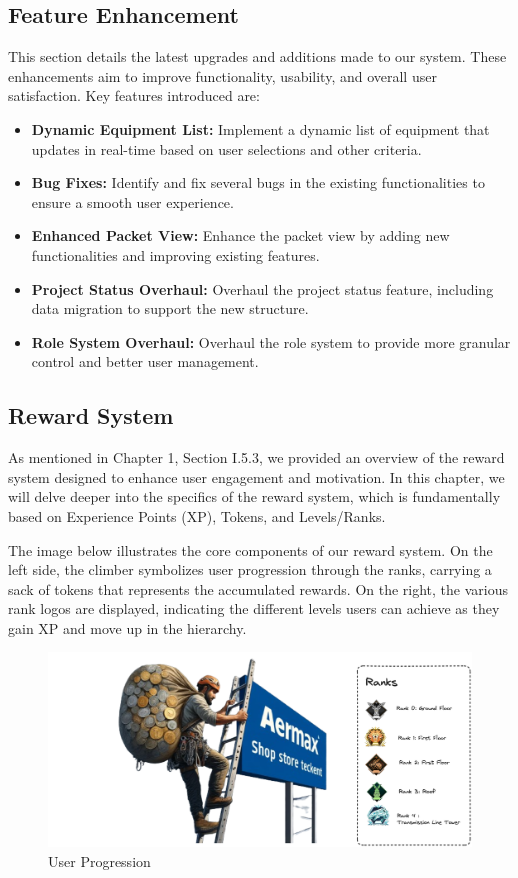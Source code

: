 \subsection{Feature Enhancement}

This section details the latest upgrades and additions made to our system. These enhancements aim to improve functionality, usability, and overall user satisfaction. Key features introduced are:

\begin{itemize}
    \item \textbf{Dynamic Equipment List:} Implement a dynamic list of equipment that updates in real-time based on user selections and other criteria.
    \item \textbf{Bug Fixes:} Identify and fix several bugs in the existing functionalities to ensure a smooth user experience.
    \item \textbf{Enhanced Packet View:} Enhance the packet view by adding new functionalities and improving existing features.
    \item \textbf{Project Status Overhaul:} Overhaul the project status feature, including data migration to support the new structure.
    \item \textbf{Role System Overhaul:} Overhaul the role system to provide more granular control and better user management.
\end{itemize}

\subsection{Reward System}
As mentioned in Chapter 1, Section I.5.3, we provided an overview of the reward system designed to enhance user engagement and motivation. In this chapter, we will delve deeper into the specifics of the reward system, which is fundamentally based on Experience Points (XP), Tokens, and Levels/Ranks.

The image below illustrates the core components of our reward system. On the left side, the climber symbolizes user progression through the ranks, carrying a sack of tokens that represents the accumulated rewards. On the right, the various rank logos are displayed, indicating the different levels users can achieve as they gain XP and move up in the hierarchy.
\begin{figure}[H]
    \centering
    \includegraphics[width=1\textwidth]{src/assets/images/AermaxClimberPng.png}
    \caption{User Progression}
    \label{fig:user_progression}
\end{figure}

